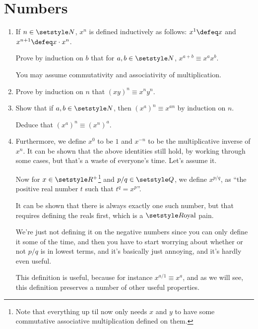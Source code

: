 \section{Numbers}

\begin{enumerate}
 \item
  If \(n \in \Naturals\), \(x^n\) is defined inductively as follows:
  \(x^1 \defeq x\) and \(x^{n + 1} \defeq x \cdot x^n\).

  Prove by induction on \(b\) that for \(a, b \in \Naturals\),
  \(x^{a + b} \equiv x^a x^b\).

  You may assume commutativity and associativity of multiplication.
 \item
  Prove by induction on \(n\) that \((xy)^n \equiv x^n y^n\).
 \item
  Show that if \(a, b \in \Naturals\), then
  \((x^a)^n \equiv x^{an}\) by induction on \(n\).

  Deduce that \((x^a)^n \equiv (x^n)^a\).
 \item
  Furthermore, we define \(x^0\) to be \(1\) and
  \(x^{-n}\) to be the multiplicative inverse of \(x^n\). It can be shown that
  the above identities still hold, by working through some cases, but that's a
  waste of everyone's time. Let's assume it.

  Now for \(x \in \Reals^+\)\footnote{
   Note that everything up til now only needs \(x\) and \(y\) to have some
   commutative associative multiplication defined on them.
  } and \(p/q \in \Rationals\), we define \(x^{p/q}\), as ``the positive real
  number \(t\) such that \(t^q = x^p\)''.

  It can be shown that there is always exactly one such number, but that
  requires defining the reals first, which is a \(\Reals\text{oyal}\) pain.

  We're just not defining it on the negative numbers since you can only define
  it some of the time, and then you have to start worrying about whether or not
  \(p/q\) is in lowest terms, and it's basically just annoying, and it's hardly
  even useful.

  This definition is useful, because for instance \(x^{a/1} \equiv x^a\), and as
  we will see, this definition preserves a number of other useful properties.


\end{enumerate}
